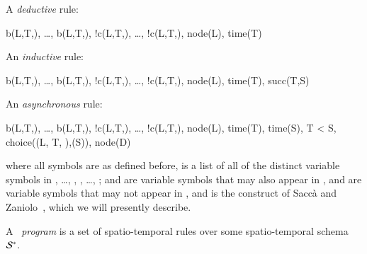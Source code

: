 
A {\em deductive} rule:

\begin{Drules}
        {b(L,T,), \ldots, b(L,T,), !c(L,T,), \ldots, !c(L,T,), node(L), time(T)}
\end{Drules}

An {\em inductive} rule:

\begin{Drules}
        {b(L,T,), \ldots, b(L,T,), !c(L,T,), \ldots, !c(L,T,), node(L), time(T), succ(T,S)}
\end{Drules}

%

An {\em asynchronous} rule:

\begin{Drules}
        {b(L,T,), \ldots, b(L,T,), !c(L,T,), \ldots, !c(L,T,), node(L), time(T), time(S), T < S, choice((L, T, ),(S)), node(D)}
\end{Drules}


where all symbols are as defined before,  is a list of all of the distinct variable symbols in , \ldots, , , \ldots, ;  and  are variable symbols that may also appear in ,  and  are variable symbols that may not appear in , and  is the construct of Sacc\`{a} and Zaniolo~\cite{sacca-zaniolo}, which we will presently describe.

A \lang\ {\em program} is a set of spatio-temporal rules over some spatio-temporal schema $\stschema$.  

